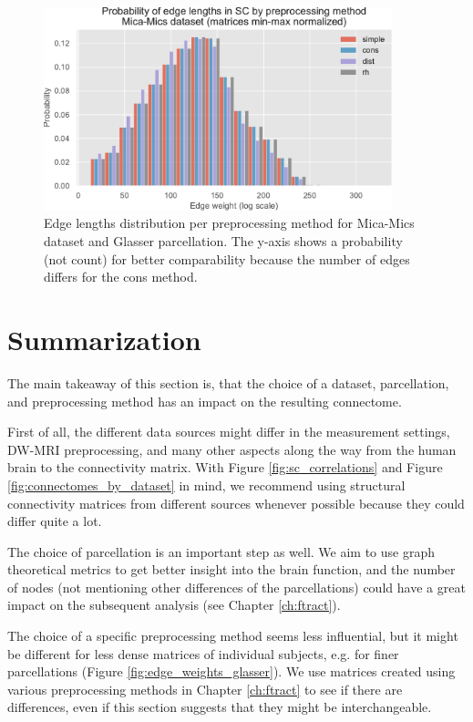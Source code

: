\begin{figure}[h!]
  \begin{center}
    \includegraphics[width=0.9\textwidth]{images/nootebook_generated/comparing_sc_matrices/MNI-HCP-MMP1/Probability_of_edge_lengths_in_SC_by_preprocessing_method_Mica-Mics_dataset_(matrices_min-max_normalized).pdf}
  \end{center}
  \caption[Edge lengths distribution per preprocessing method]{Edge lengths distribution per preprocessing method for Mica-Mics dataset and Glasser parcellation. The y-axis shows a probability (not count) for better comparability because the number of edges differs for the cons method.}
  \label{fig:edge_lengths_glasser}
\end{figure}

\section{Summarization}

The main takeaway of this section is, that the choice of a dataset, parcellation, and preprocessing method has an impact on the resulting connectome. 

First of all, the different data sources might differ in the measurement settings, DW-MRI preprocessing, and many other aspects along the way from the human brain to the connectivity matrix. With Figure \ref{fig:sc_correlations} and Figure \ref{fig:connectomes_by_dataset} in mind, we recommend using structural connectivity matrices from different sources whenever possible because they could differ quite a lot.

The choice of parcellation is an important step as well. We aim to use graph theoretical metrics to get better insight into the brain function, and the number of nodes (not mentioning other differences of the parcellations) could have a great impact on the subsequent analysis (see Chapter \ref{ch:ftract}).

The choice of a specific preprocessing method seems less influential, but it might be different for less dense matrices of individual subjects, e.g. for finer parcellations (Figure \ref{fig:edge_weights_glasser}). We use matrices created using various preprocessing methods in Chapter \ref{ch:ftract} to see if there are differences, even if this section suggests that they might be interchangeable.